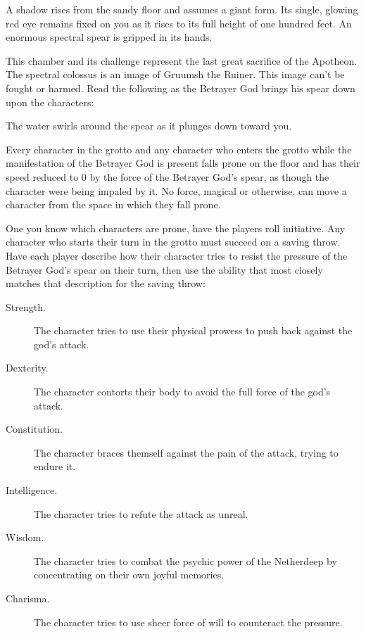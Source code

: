 \documentclass[10pt,a4paper,twoside,fancy,bg=print,twocolumn,openany,nodeprecatedcode]{dndbook}
\begin{document}
\begin{DndReadAloud}{}
A shadow rises from the sandy floor and assumes a giant form. Its single, glowing red eye remains fixed on you as it rises to its full height of one hundred feet. An enormous spectral spear is gripped in its hands.

\end{DndReadAloud}

This chamber and its challenge represent the last great sacrifice of the Apotheon. The spectral colossus is an image of Gruumsh the Ruiner. This image can't be fought or harmed. Read the following as the Betrayer God brings his spear down upon the characters:

\begin{DndReadAloud}{}
The water swirls around the spear as it plunges down toward you.

\end{DndReadAloud}

Every character in the grotto and any character who enters the grotto while the manifestation of the Betrayer God is present falls prone on the floor and has their speed reduced to 0 by the force of the Betrayer God's spear, as though the character were being impaled by it. No force, magical or otherwise, can move a character from the space in which they fall prone.

One you know which characters are prone, have the players roll initiative. Any character who starts their turn in the grotto must succeed on a saving throw. Have each player describe how their character tries to resist the pressure of the Betrayer God's spear on their turn, then use the ability that most closely matches that description for the saving throw:


\begin{description}
\item[Strength.]
The character tries to use their physical prowess to push back against the god's attack.
\item[Dexterity.]
The character contorts their body to avoid the full force of the god's attack.
\item[Constitution.]
The character braces themself against the pain of the attack, trying to endure it.
\item[Intelligence.]
The character tries to refute the attack as unreal.
\item[Wisdom.]
The character tries to combat the psychic power of the Netherdeep by concentrating on their own joyful memories.
\item[Charisma.]
The character tries to use sheer force of will to counteract the pressure.
\end{description}
\end{document}
